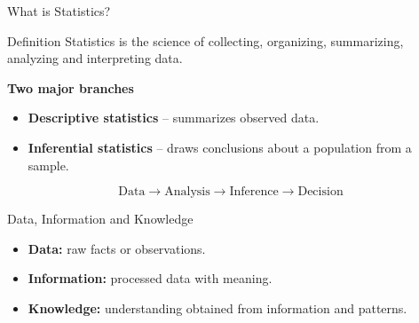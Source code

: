 \documentclass[aspectratio=169,11pt]{beamer}
\begin{document}
\begin{frame}{What is Statistics?}

\begin{block}{Definition}
Statistics is the science of collecting, organizing, summarizing,
analyzing and interpreting data.
\end{block}

\vspace{0.3cm}

\textbf{Two major branches}

\begin{itemize}
    \item \textbf{Descriptive statistics} -- summarizes observed data.
    \item \textbf{Inferential statistics} -- draws conclusions about a population from a sample.
\end{itemize}

\[
\boxed{\text{Data}\rightarrow\text{Analysis}\rightarrow\text{Inference}\rightarrow\text{Decision}}
\]

\end{frame}

\begin{frame}{Data, Information and Knowledge}

\begin{center}
\end{center}

\vspace{0.5cm}

\begin{itemize}
    \item \textbf{Data:} raw facts or observations.
    \item \textbf{Information:} processed data with meaning.
    \item \textbf{Knowledge:} understanding obtained from information and patterns.
\end{itemize}

\end{frame}
\end{document}
